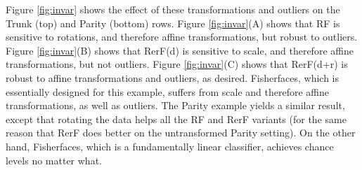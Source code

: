 \documentclass{article} %
\begin{document}
Figure \ref{fig:invar} shows the effect of these transformations and outliers on the Trunk (top) and Parity (bottom) rows. Figure \ref{fig:invar}(A) shows that RF is sensitive to rotations, and therefore affine transformations, but robust to outliers.  Figure \ref{fig:invar}(B) shows that RerF(d) is sensitive to scale, and therefore affine transformations, but not outliers.   Figure \ref{fig:invar}(C) shows that RerF(d+r) is robust to affine transformations and outliers, as desired.  Fisherfaces, which is essentially designed for this example, suffers from scale and therefore affine transformations, as well as outliers.  The Parity example yields a similar result, except that rotating the data helps all the RF and RerF variants (for the same reason that RerF does better on the untransformed Parity setting).  
On the other hand, Fisherfaces, which is a fundamentally linear classifier, achieves chance levels no matter what.  

\end{document}
